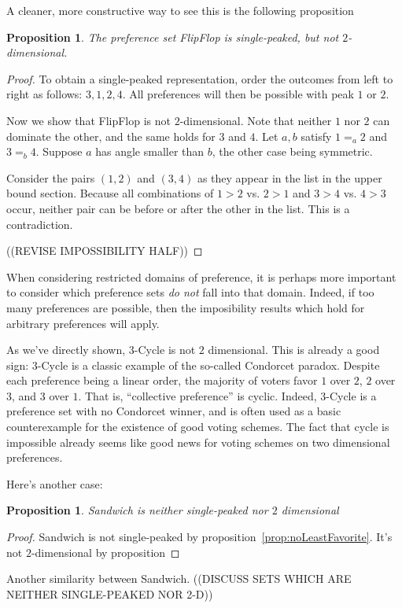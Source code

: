 \documentclass[12pt]{article}
\newtheorem{proposition}[theorem]{Proposition}
\newcommand{\1}[1]{\mathds{1}[{#1}]}
\begin{document}
  A cleaner, more constructive way to see this is the following proposition
  \begin{proposition}
    The preference set {\sc FlipFlop} is single-peaked, but not
    $2$-dimensional.
  \end{proposition}
  \begin{proof}
    To obtain a single-peaked representation, order the outcomes
    from left to right as follows: $3,1,2,4$.
    All preferences will then be possible with peak $1$ or $2$.

    Now we show that {\sc FlipFlop} is not $2$-dimensional.
    Note that neither $1$ nor $2$ can dominate the other,
    and the same holds for $3$ and $4$.
    Let $a,b$ satisfy $1=_a2$ and $3=_b4$.
    Suppose $a$ has angle smaller than $b$, the other case being symmetric.

    Consider the pairs $(1,2)$ and $(3,4)$ as they appear in the list in the
    upper bound section. Because all combinations of $1>2$ vs. $2>1$ and
    $3>4$ vs. $4>3$ occur, neither pair can be before or after the other in the
    list. This is a contradiction.

    ((REVISE IMPOSSIBILITY HALF))
  \end{proof}

  When considering restricted domains of preference, it is perhaps more
  important to consider which preference sets \emph{do not} fall into that
  domain. Indeed, if too many preferences are possible, then the imposibility
  results which hold for arbitrary preferences will apply.

  As we've directly shown, $3$-{\sc Cycle} is not $2$ dimensional.
  This is already a good sign: $3$-{\sc Cycle} is a classic example of the
  so-called Condorcet paradox. Despite each preference being a linear order,
  the majority of voters favor $1$ over $2$, $2$ over $3$, and $3$ over $1$.
  That is, ``collective preference'' is cyclic.
  Indeed, $3$-{\sc Cycle} is a preference set with no Condorcet winner,
  and is often used as a basic counterexample for the existence of good voting
  schemes. The fact that cycle is impossible already seems like good news for
  voting schemes on two dimensional preferences.

  Here's another case:
  \begin{proposition}
    {\sc Sandwich} is neither single-peaked nor $2$ dimensional
  \end{proposition}
  \begin{proof}
    {\sc Sandwich} is not single-peaked by proposition~\ref{prop:noLeastFavorite}.
    It's not $2$-dimensional by proposition
  \end{proof}
  Another similarity between {\sc Sandwich}.
  ((DISCUSS SETS WHICH ARE NEITHER SINGLE-PEAKED NOR 2-D))
\end{document}
